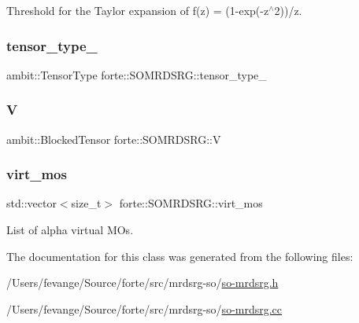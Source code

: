 Threshold for the Taylor expansion of f(z) = (1-\/exp(-\/z$^\wedge$2))/z. 

\mbox{\label{classforte_1_1_s_o_m_r_d_s_r_g_a8e981efd67c239545719e81d04409014}} 
\subsubsection{\texorpdfstring{tensor\+\_\+type\+\_\+}{tensor\_type\_}}
{\footnotesize\ttfamily ambit\+::\+Tensor\+Type forte\+::\+S\+O\+M\+R\+D\+S\+R\+G\+::tensor\+\_\+type\+\_\+\hspace{0.3cm}{\ttfamily [protected]}}

\mbox{\label{classforte_1_1_s_o_m_r_d_s_r_g_a7622bcf46fdad30ab325008e244af10c}} 
\subsubsection{\texorpdfstring{V}{V}}
{\footnotesize\ttfamily ambit\+::\+Blocked\+Tensor forte\+::\+S\+O\+M\+R\+D\+S\+R\+G\+::V\hspace{0.3cm}{\ttfamily [protected]}}

\mbox{\label{classforte_1_1_s_o_m_r_d_s_r_g_a8e20b9eca3554dec9beef02b83358634}} 
\subsubsection{\texorpdfstring{virt\+\_\+mos}{virt\_mos}}
{\footnotesize\ttfamily std\+::vector$<$size\+\_\+t$>$ forte\+::\+S\+O\+M\+R\+D\+S\+R\+G\+::virt\+\_\+mos\hspace{0.3cm}{\ttfamily [protected]}}



List of alpha virtual M\+Os. 



The documentation for this class was generated from the following files\+:\begin{DoxyCompactItemize}
\item 
/\+Users/fevange/\+Source/forte/src/mrdsrg-\/so/\mbox{\hyperlink{so-mrdsrg_8h}{so-\/mrdsrg.\+h}}\item 
/\+Users/fevange/\+Source/forte/src/mrdsrg-\/so/\mbox{\hyperlink{so-mrdsrg_8cc}{so-\/mrdsrg.\+cc}}\end{DoxyCompactItemize}
